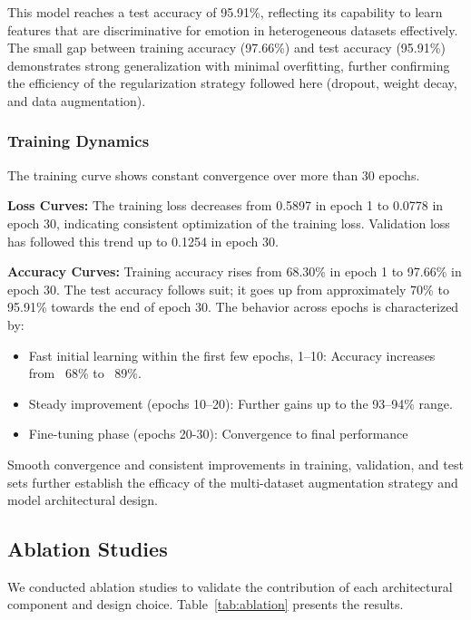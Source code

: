 \documentclass[conference]{IEEEtran}
\begin{document}
This model reaches a test accuracy of 95.91\%, reflecting its capability to learn features that are discriminative for emotion in heterogeneous datasets effectively. The small gap between training accuracy (97.66\%) and test accuracy (95.91\%) demonstrates strong generalization with minimal overfitting, further confirming the efficiency of the regularization strategy followed here (dropout, weight decay, and data augmentation).

\subsubsection{Training Dynamics}

The training curve shows constant convergence over more than 30 epochs.

\textbf{Loss Curves:} The training loss decreases from 0.5897 in epoch 1 to 0.0778 in epoch 30, indicating consistent optimization of the training loss. Validation loss has followed this trend up to 0.1254 in epoch 30.

\textbf{Accuracy Curves:} Training accuracy rises from 68.30\% in epoch 1 to 97.66\% in epoch 30. The test accuracy follows suit; it goes up from approximately 70\% to 95.91\% towards the end of epoch 30. The behavior across epochs is characterized by:
\begin{itemize}
    \item Fast initial learning within the first few epochs, 1–10: Accuracy increases from ~68\% to ~89\%.
    \item Steady improvement (epochs 10–20): Further gains up to the 93–94\% range.
    \item Fine-tuning phase (epochs 20-30): Convergence to final performance
\end{itemize}

Smooth convergence and consistent improvements in training, validation, and test sets further establish the efficacy of the multi-dataset augmentation strategy and model architectural design.

\subsection{Ablation Studies}

We conducted ablation studies to validate the contribution of each architectural component and design choice. Table~\ref{tab:ablation} presents the results.
\end{document}

